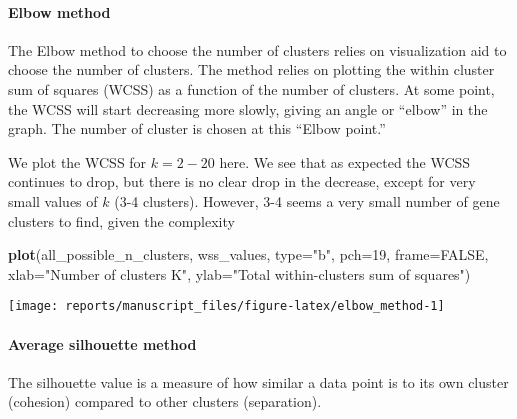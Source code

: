 \documentclass[9pt,a4paper,]{extarticle}
\newenvironment{Shaded}{\begin{snugshade}}{\end{snugshade}}
\newcommand{\DataTypeTok}[1]{\textcolor[rgb]{0.13,0.29,0.53}{#1}}
\newcommand{\DecValTok}[1]{\textcolor[rgb]{0.00,0.00,0.81}{#1}}
\newcommand{\KeywordTok}[1]{\textcolor[rgb]{0.13,0.29,0.53}{\textbf{#1}}}
\newcommand{\NormalTok}[1]{#1}
\newcommand{\OtherTok}[1]{\textcolor[rgb]{0.56,0.35,0.01}{#1}}
\newcommand{\StringTok}[1]{\textcolor[rgb]{0.31,0.60,0.02}{#1}}
\begin{document}
\hypertarget{elbow-method}{%
\paragraph{Elbow method}\label{elbow-method}}

The Elbow method to choose the number of clusters relies on visualization aid
to choose the number of clusters. The method relies on plotting the within
cluster sum of squares (WCSS) as a function of the number of clusters. At some
point, the WCSS will start decreasing more slowly, giving an angle or ``elbow''
in the graph. The number of cluster is chosen at this ``Elbow point.''

We plot the WCSS for \(k=2-20\) here. We see that as expected the WCSS continues
to drop, but there is no clear drop in the decrease, except for very small
values of \(k\) (3-4 clusters). However, 3-4 seems a very small number of gene
clusters to find, given the complexity

\begin{Shaded}
\begin{Highlighting}[]
\KeywordTok{plot}\NormalTok{(all_possible_n_clusters, wss_values,}
     \DataTypeTok{type=}\StringTok{"b"}\NormalTok{, }\DataTypeTok{pch=}\DecValTok{19}\NormalTok{, }\DataTypeTok{frame=}\OtherTok{FALSE}\NormalTok{, }
     \DataTypeTok{xlab=}\StringTok{"Number of clusters K"}\NormalTok{,}
     \DataTypeTok{ylab=}\StringTok{"Total within-clusters sum of squares"}\NormalTok{)}
\end{Highlighting}
\end{Shaded}

\begin{center}\texttt{[image: reports/manuscript\_files/figure-latex/elbow\_method-1]} \end{center}

\hypertarget{average-silhouette-method}{%
\paragraph{Average silhouette method}\label{average-silhouette-method}}

The silhouette value is a measure of how similar a data point is to its own
cluster (cohesion) compared to other clusters (separation).
\end{document}
